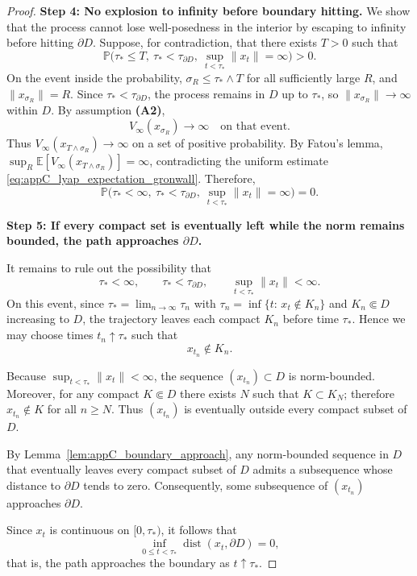 \documentclass[pdflatex,sn-mathphys-ay]{sn-jnl}
\theoremstyle{thmstyleone}
\theoremstyle{definition}
\theoremstyle{remark}
\begin{document}
\begin{appendices}
\begin{proof}
\medskip
\noindent\textbf{Step 4: No explosion to infinity before boundary hitting.}
We show that the process cannot lose well-posedness in the interior by escaping to infinity before hitting \(\partial D\). Suppose, for contradiction, that there exists \(T>0\) such that
\[
\mathbb P\bigl(\tau_* \le T,\ \tau_*<\tau_{\partial D},\ \sup_{t<\tau_*}\|x_t\|=\infty \bigr)>0.
\]
On the event inside the probability, \(\sigma_R\le \tau_*\wedge T\) for all sufficiently large \(R\), and \(\|x_{\sigma_R}\|=R\). Since \(\tau_*<\tau_{\partial D}\), the process remains in \(D\) up to \(\tau_*\), so \(\|x_{\sigma_R}\|\to\infty\) within \(D\). By assumption \textbf{(A2)},
\[
V_\infty(x_{\sigma_R})\to\infty
\quad\text{on that event.}
\]
Thus \(V_\infty(x_{T\wedge \sigma_R})\to\infty\) on a set of positive probability. By Fatou's lemma, \(\sup_R \mathbb E[V_\infty(x_{T\wedge \sigma_R})]=\infty\), contradicting the uniform estimate \eqref{eq:appC_lyap_expectation_gronwall}. Therefore,
\begin{equation}
\label{eq:appC_no_infinity_escape}
\mathbb P\bigl(\tau_*<\infty,\ \tau_*<\tau_{\partial D},\ \sup_{t<\tau_*}\|x_t\|=\infty\bigr)=0.
\end{equation}

\medskip
\noindent\textbf{Step 5: If every compact set is eventually left while the norm remains bounded, the path approaches $\partial D$.}

It remains to rule out the possibility that
\[
\tau_*<\infty,\qquad \tau_*<\tau_{\partial D},\qquad 
\sup_{t<\tau_*}\|x_t\|<\infty .
\]
On this event, since $\tau_*=\lim_{n\to\infty}\tau_n$ with
$\tau_n=\inf\{t:\,x_t\notin K_n\}$ and $K_n\Subset D$ increasing to $D$,
the trajectory leaves each compact $K_n$ before time $\tau_*$. Hence we may
choose times $t_n\uparrow\tau_*$ such that
\[
x_{t_n}\notin K_n .
\]

Because $\sup_{t<\tau_*}\|x_t\|<\infty$, the sequence $(x_{t_n})\subset D$
is norm-bounded. Moreover, for any compact $K\Subset D$ there exists $N$
such that $K\subset K_N$; therefore $x_{t_n}\notin K$ for all $n\ge N$.
Thus $(x_{t_n})$ is eventually outside every compact subset of $D$.

By Lemma~\ref{lem:appC_boundary_approach}, any norm-bounded sequence in $D$
that eventually leaves every compact subset of $D$ admits a subsequence whose
distance to $\partial D$ tends to zero. Consequently, some subsequence of
$(x_{t_n})$ approaches $\partial D$.

Since $x_t$ is continuous on $[0,\tau_*)$, it follows that
\[
\inf_{0\le t<\tau_*}\operatorname{dist}(x_t,\partial D)=0,
\]
that is, the path approaches the boundary as $t\uparrow\tau_*$.


\end{proof}
\end{appendices}
\end{document}
